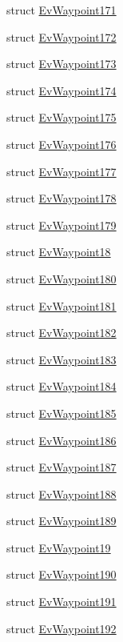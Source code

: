 \begin{DoxyCompactItemize}
struct \hyperlink{structsmacc_1_1EvWaypoint171}{Ev\+Waypoint171}
\item 
struct \hyperlink{structsmacc_1_1EvWaypoint172}{Ev\+Waypoint172}
\item 
struct \hyperlink{structsmacc_1_1EvWaypoint173}{Ev\+Waypoint173}
\item 
struct \hyperlink{structsmacc_1_1EvWaypoint174}{Ev\+Waypoint174}
\item 
struct \hyperlink{structsmacc_1_1EvWaypoint175}{Ev\+Waypoint175}
\item 
struct \hyperlink{structsmacc_1_1EvWaypoint176}{Ev\+Waypoint176}
\item 
struct \hyperlink{structsmacc_1_1EvWaypoint177}{Ev\+Waypoint177}
\item 
struct \hyperlink{structsmacc_1_1EvWaypoint178}{Ev\+Waypoint178}
\item 
struct \hyperlink{structsmacc_1_1EvWaypoint179}{Ev\+Waypoint179}
\item 
struct \hyperlink{structsmacc_1_1EvWaypoint18}{Ev\+Waypoint18}
\item 
struct \hyperlink{structsmacc_1_1EvWaypoint180}{Ev\+Waypoint180}
\item 
struct \hyperlink{structsmacc_1_1EvWaypoint181}{Ev\+Waypoint181}
\item 
struct \hyperlink{structsmacc_1_1EvWaypoint182}{Ev\+Waypoint182}
\item 
struct \hyperlink{structsmacc_1_1EvWaypoint183}{Ev\+Waypoint183}
\item 
struct \hyperlink{structsmacc_1_1EvWaypoint184}{Ev\+Waypoint184}
\item 
struct \hyperlink{structsmacc_1_1EvWaypoint185}{Ev\+Waypoint185}
\item 
struct \hyperlink{structsmacc_1_1EvWaypoint186}{Ev\+Waypoint186}
\item 
struct \hyperlink{structsmacc_1_1EvWaypoint187}{Ev\+Waypoint187}
\item 
struct \hyperlink{structsmacc_1_1EvWaypoint188}{Ev\+Waypoint188}
\item 
struct \hyperlink{structsmacc_1_1EvWaypoint189}{Ev\+Waypoint189}
\item 
struct \hyperlink{structsmacc_1_1EvWaypoint19}{Ev\+Waypoint19}
\item 
struct \hyperlink{structsmacc_1_1EvWaypoint190}{Ev\+Waypoint190}
\item 
struct \hyperlink{structsmacc_1_1EvWaypoint191}{Ev\+Waypoint191}
\item 
struct \hyperlink{structsmacc_1_1EvWaypoint192}{Ev\+Waypoint192}

\end{DoxyCompactItemize}
